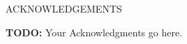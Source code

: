 \label{chap:acknowledgements}

\begin{center}
  \uppercase{Acknowledgements}
\end{center}

\bigskip


\textbf{TODO:}  Your Acknowledgments go here. 


\newpage